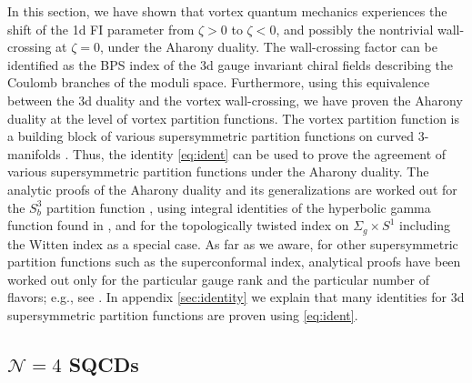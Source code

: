 \documentclass[a4paper,11pt]{article}
\begin{document}
In this section, we have shown that vortex quantum mechanics experiences the shift of the 1d FI parameter from $\zeta > 0$ to $\zeta < 0 $, and possibly the nontrivial wall-crossing at $\zeta = 0$, under the Aharony duality. The wall-crossing factor can be identified as the BPS index of the 3d gauge invariant chiral fields describing the Coulomb branches of the moduli space. Furthermore, using this equivalence between the 3d duality and the vortex wall-crossing, we have proven the Aharony duality at the level of vortex partition functions. The vortex partition function is a building block of various supersymmetric partition functions on curved 3-manifolds \cite{Krattenthaler:2011da,Dimofte:2011ju,Pasquetti:2011fj,Beem:2012mb,Hwang:2012jh,Taki:2013opa,Cecotti:2013mba,Fujitsuka:2013fga,Benini:2013yva,Benini:2015noa}. Thus, the identity \eqref{eq:ident} can be used to prove the agreement of various supersymmetric partition functions under the Aharony duality. The analytic proofs of the Aharony duality and its generalizations are worked out for the $S^3_b$ partition function \cite{Willett:2011gp,Benini:2011mf,Amariti:2014lla}, using integral identities of the hyperbolic gamma function found in \cite{Bult:2007}, and for the topologically twisted index on $\Sigma_g \times S^1$ \cite{Closset:2016arn} including the Witten index \cite{Intriligator:2013lca} as a special case. As far as we aware, for other supersymmetric partition functions such as the superconformal index, analytical proofs have been worked out only for the particular gauge rank and the particular number of flavors; e.g., see \cite{Krattenthaler:2011da,Hwang:2012jh}. In appendix \ref{sec:identity} we explain that many identities for 3d supersymmetric partition functions are proven using \eqref{eq:ident}.
\\



\subsection{$\mathcal N = 4$ SQCDs}
\label{sec:N=4 SQCD}
\end{document}
